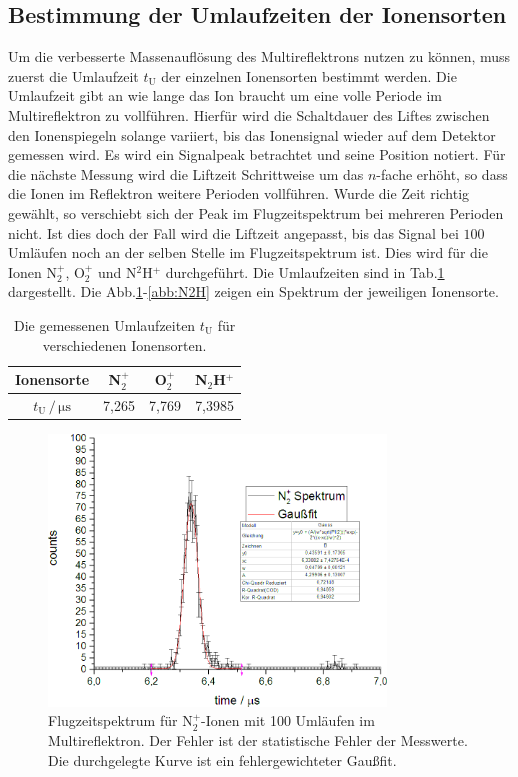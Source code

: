 \documentclass[numbers=noenddot,a4paper,notitlepage,twoside,BCOR15mm]{scrartcl}
\begin{document}
	\subsection{Bestimmung der Umlaufzeiten der Ionensorten}
	
	Um die verbesserte Massenauflösung des Multireflektrons nutzen zu können, muss zuerst die Umlaufzeit $t_\mathrm{U}$ der einzelnen Ionensorten bestimmt werden. Die Umlaufzeit gibt an wie lange das Ion braucht um eine volle Periode im Multireflektron zu vollführen. Hierfür wird die Schaltdauer des Liftes zwischen den Ionenspiegeln solange variiert, bis das Ionensignal wieder auf dem Detektor gemessen wird. Es wird ein Signalpeak betrachtet und seine Position notiert. Für die nächste Messung wird die Liftzeit Schrittweise um das $n$-fache erhöht, so dass die Ionen im Reflektron weitere Perioden vollführen. Wurde die Zeit richtig gewählt, so verschiebt sich der Peak im Flugzeitspektrum bei mehreren Perioden nicht. Ist dies doch der Fall wird die Liftzeit angepasst, bis das Signal bei $100$ Umläufen noch an der selben Stelle im Flugzeitspektrum ist. Dies wird für die Ionen N$_2^+$, O$_2^+$ und N$^2$H$^+$ durchgeführt. Die Umlaufzeiten sind in Tab.\ref{tab:umlauf} dargestellt. Die Abb.\ref{abb:N2}-\ref{abb:N2H} zeigen ein Spektrum der jeweiligen Ionensorte.
	
	\begin{table}[h]
		\centering
		\caption{Die gemessenen Umlaufzeiten $t_\mathrm{U}$ für verschiedenen Ionensorten.}
		\begin{tabular}{c|c c c}
			Ionensorte & N$_2^+$ & O$_2^+$ & N$_2$H$^+$  \\ \hline
			$t_\mathrm{U}\, /\,\mathrm{\mu s}$ & 7,265 & 7,769 & 7,3985 \\ 
		\end{tabular}
		\label{tab:umlauf}
	\end{table}
	
	\begin{figure}[h]
		\centering
		\includegraphics[width=0.8\textwidth]{pics/N2}
		\caption{Flugzeitspektrum für N${}_2^+$-Ionen mit 100 Umläufen im Multireflektron. Der Fehler ist der statistische Fehler der Messwerte. Die durchgelegte Kurve ist ein fehlergewichteter Gaußfit.}
		\label{abb:N2}
	\end{figure}
	
\end{document}
